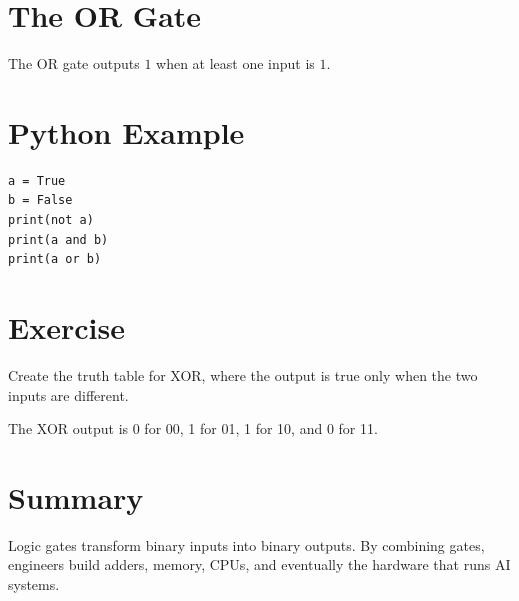 \section{The OR Gate}
The OR gate outputs \(1\) when at least one input is \(1\).

\section{Python Example}
\begin{lstlisting}
a = True
b = False
print(not a)
print(a and b)
print(a or b)
\end{lstlisting}

\section{Exercise}
\begin{exercise}Create the truth table for XOR, where the output is true only when the two inputs are different.\end{exercise}
\begin{solution}The XOR output is 0 for 00, 1 for 01, 1 for 10, and 0 for 11.\end{solution}

\section{Summary}
Logic gates transform binary inputs into binary outputs. By combining gates, engineers build adders, memory, CPUs, and eventually the hardware that runs AI systems.
